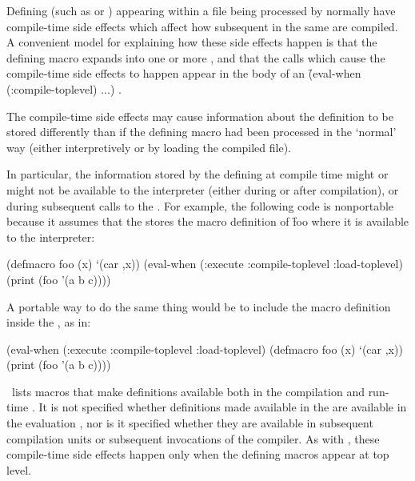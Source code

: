 
Defining  (such as  or )
appearing within a file being processed by 
normally have compile-time side effects which affect how subsequent 
in the same  are compiled.  A convenient model for explaining how these
side effects happen is that the defining macro expands into one or
more  , and that the calls which cause the compile-time
side effects to happen appear 
in the body of an \f{(eval-when (:compile-toplevel) ...)} .

The compile-time side effects may cause information about the definition to
be stored differently than if the defining macro had been processed in the
`normal' way (either interpretively or by loading the compiled file).

In particular, the information stored by the defining  at compile time
might or might not be available to the interpreter (either during or after compilation),
or during subsequent calls to the .  For example,
the following code is nonportable because it assumes that the 
stores the macro definition of \f{foo} where it is available to the interpreter:
    
\code
 (defmacro foo (x) `(car ,x))
 (eval-when (:execute :compile-toplevel :load-toplevel)
   (print (foo '(a b c))))
\endcode
    
A portable way to do the same thing would be to include the macro
definition inside the  , as in:
    
\code
 (eval-when (:execute :compile-toplevel :load-toplevel)
   (defmacro foo (x) `(car ,x))
   (print (foo '(a b c))))
\endcode



\Thenextfigure\ lists macros that make definitions
available both in the compilation and run-time .
It is not specified whether definitions made available in the
 are available in the evaluation
, nor is it specified whether they are available
in subsequent compilation units or subsequent invocations of the
compiler.  As with , these compile-time side
effects happen only when the defining macros appear at 
top level.
 
